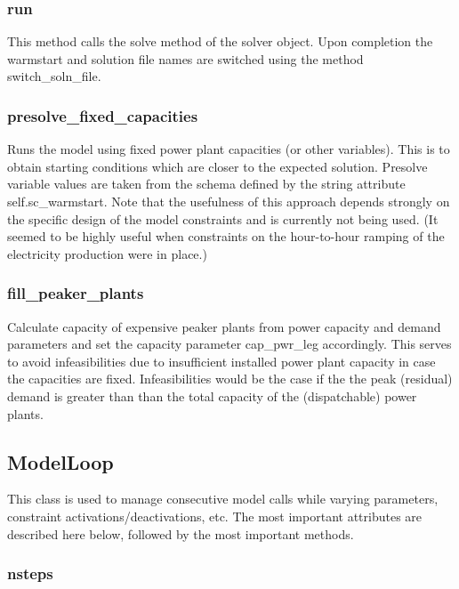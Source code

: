 \documentclass[]{article}
\begin{document}
\subsubsection{run}\label{run}

This method calls the solve method of the solver object. Upon completion
the warmstart and solution file names are switched using the method
switch\_soln\_file.

\subsubsection{presolve\_fixed\_capacities}\label{presolveux5ffixedux5fcapacities}

Runs the model using fixed power plant capacities (or other variables).
This is to obtain starting conditions which are closer to the expected
solution. Presolve variable values are taken from the schema defined by
the string attribute self.sc\_warmstart. Note that the usefulness of
this approach depends strongly on the specific design of the model
constraints and is currently not being used. (It seemed to be highly
useful when constraints on the hour-to-hour ramping of the electricity
production were in place.)

\subsubsection{fill\_peaker\_plants}\label{fillux5fpeakerux5fplants}

Calculate capacity of expensive peaker plants from power capacity
and demand parameters and set the capacity parameter cap\_pwr\_leg
accordingly. This serves to avoid infeasibilities due to insufficient
installed power plant capacity in case the capacities are fixed.
Infeasibilities would be the case if the the peak (residual) demand is
greater than than the total capacity of the (dispatchable) power plants.

\subsection{ModelLoop}\label{modelloop}

This class is used to manage consecutive model calls while varying
parameters, constraint activations/deactivations, etc. The most
important attributes are described here below, followed by the most
important methods.

\subsubsection{nsteps}\label{nsteps}
\end{document}
